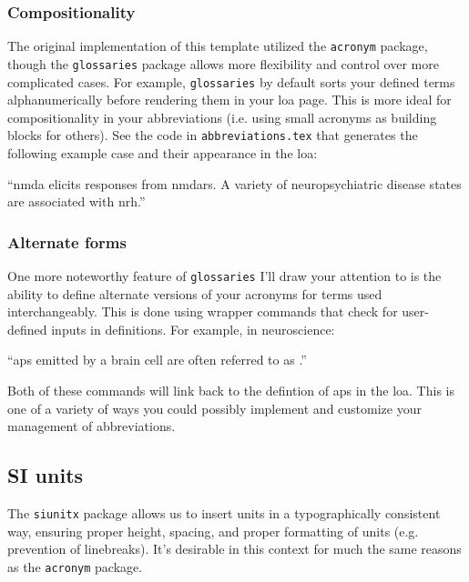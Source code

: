 \documentclass[../../main.tex]{subfiles}  %
\begin{document}
	\subsubsection{Compositionality}

	The original implementation of this template utilized the \verb|acronym| package, though the \verb|glossaries| package allows more flexibility and control over more complicated cases.
	For example, \verb|glossaries| by default sorts your defined terms alphanumerically before rendering them in your \gls{loa} page. 
	This is more ideal for compositionality in your abbreviations (i.e. using small acronyms as building blocks for others). 
	See the code in \verb|abbreviations.tex| that generates the following example case and their appearance in the \gls{loa}: 
	\begin{displayquote}  %
		``\gls{nmda} elicits responses from \glspl{nmdar}. 
		A variety of neuropsychiatric disease states are associated with \gls{nrh}.''	
	\end{displayquote}

	\subsubsection{Alternate forms}

	One more noteworthy feature of \verb|glossaries| I'll draw your attention to is the ability to define alternate versions of your acronyms for terms used interchangeably.
	This is done using wrapper commands that check for user-defined inputs in definitions.
	For example, in neuroscience: 
	
	\begin{displayquote}
		``\glspl{ap} emitted by a brain cell are often referred to as .''
	\end{displayquote}

	Both of these commands will link back to the defintion of \glspl{ap} in the \gls{loa}.
	This is one of a variety of ways you could possibly implement and customize your management of abbreviations.

	\subsection{SI units}

	The \verb|siunitx| package allows us to insert units in a typographically consistent way, ensuring proper height, spacing, and proper formatting of units (e.g. prevention of linebreaks).
	It's desirable in this context for much the same reasons as the \verb|acronym| package.
\end{document}

